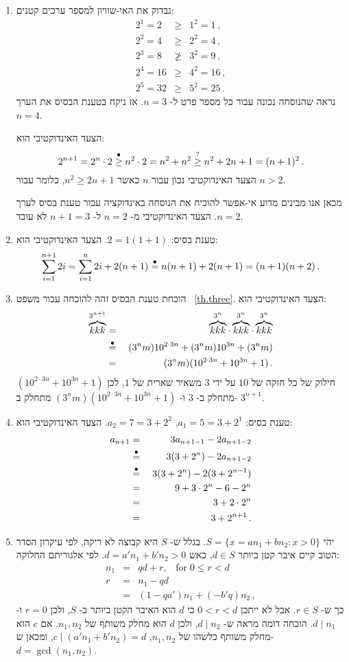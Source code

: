 \begin{enumerate}
\item
נבדוק את האי-שוויון למספר ערכים קטנים:
\begin{eqnarray*}
2^1=2&\geq& 1^2 = 1\,,\\
2^2=4&\geq& 2^2 = 4\,,\\
2^3=8&\not\geq& 3^2 = 9\,,\\
2^4=16&\geq& 4^2 = 16\,,\\
2^5=32&\geq& 5^2 = 25\,.
\end{eqnarray*}
נראה שהנוסחה נכונה עבור כל מספר פרט ל-%
$n=3$.
אז ניקח בטענת הבסיס את הערך
$n=4$.

הצעד האינדוקטיבי הוא:
\[
2^{n+1}=2^n\cdot 2 \stackrel{\bullet}{\geq}{} n^2\cdot 2 = n^2 + n^2 \stackrel{?}{\geq} n^2 + 2n + 1 = (n+1)^2\,.
\]
הצעד האינדוקטיבי נכון עבור 
$n$
כאשר
$n^2\geq 2n+1$,
כלומר עבור
$n>2$.

מכאן אנו מבינים מדוע אי-אפשר להוכיח את הנוסחה באינדוקציה עבור טענת בסיס לערך
$n=2$.
הצעד האינדוקטיבי מ-%
$n=2$
ל-%
$n+1=3$
לא עובד.

\item 
טענת בסיס:
$2=1(1+1)$.
הצעד האינדוקטיבי הוא:
\[
\sum_{i=1}^{n+1} 2i = \sum_{i=1}^n 2i + 2(n+1) \stackrel{\bullet}{=}{} n(n+1) + 2(n+1)= (n+1)(n+2)\,.
\]

\item
הוכחת טענת הבסיס זהה להוכחה עבור משפט~%
\ref{th.three}.
הצעד האינדוקטיבי הוא:
\begin{eqnarray*}
\overbrace{kkk}^{3^{n+1}} &=& \overbrace{kkk}^{3^n}\cdot\overbrace{kkk}^{3^n}\cdot \overbrace{kkk}^{3^n}\\
&\stackrel{\bullet}{=}{}&(3^nm)10^{2\cdot 3n} + (3^nm)10^{3n} + (3^nm)\\
&=&(3^nm)(10^{2\cdot 3n} + 10^{3n} + 1)\,.
\end{eqnarray*}
חילוק של כל חזקה של 
$10$
על ידי
$3$
משאיר שארית של
$1$,
לכן
$(10^{2\cdot 3n} + 10^{3n} + 1)$
מתחלק ב-%
$3$
ו-
$(3^nm)(10^{2\cdot 3n} + 10^{3n} + 1)$
מתחלק ב-%
$3^{n+1}$.

\item
טענת בסיס:
$a_1=5=3+2^1$, $a_2=7=3+2^2$.
הצעד האינדוקטיבי הוא:
\begin{eqnarray*}
a_{n+1}&=&3a_{n+1-1}-2a_{n+1-2}\\
&\stackrel{\bullet}{=}{}&3(3+2^n)-2a_{n+1-2}\\
&\stackrel{\bullet}{=}{}&3(3+2^n)-2(3+2^{n-1})\\
&=&9 + 3\cdot 2^n-6-2^n\\
&=&3+2\cdot 2^n\\
&=&3+2^{n+1}\,.
\end{eqnarray*}
\item 
יהי
$S=\{x = an_1+bn_2: x>0\}$.
בגלל ש-%
$S$
היא קבוצה לא ריקה, לפי עיקרון הסדר הטוב קיים איבר קטן ביותר
 $d\in S$,
כאש
$d=a'n_1+b'n_2>0$.
לפי אלגוריתם החלוקה:
\begin{eqnarray*}
n_1&=&qd+r,\;\;\; \mathrm{for}\;0\leq r < d\\
r &=& n_1-qd\\
&=& (1-qa')n_1+(-b'q)n_2\,,
\end{eqnarray*}
כך ש-%
$r\in S$.
אבל לא ייתכן
$0<r<d$
כי
$d$
הוא האיבר הקטן ביותר ב-%
$S$,
ולכן
$r=0$
ו-%
$d\mid n_1$.
הוכחה דומה מראה ש-%
$d\mid n_2$,
ולכן
$d$
הוא מחלק משותף של
$n_1,n_2$.
אם 
$c$
הוא מחלק משותף כלשהו של
$n_1, n_2$,
$c\mid (a'n_1+b'n_2)=d$,
ומכאן ש-%
$d=\gcd(n_1,n_2)$.


\end{enumerate}
